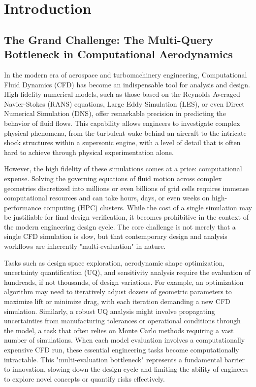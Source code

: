 \documentclass[dscexam, EN]{ufabcFHZh}
\begin{document}
\chapter{Introduction}

\section{The Grand Challenge: The Multi-Query Bottleneck in Computational Aerodynamics}

In the modern era of aerospace and turbomachinery engineering, Computational Fluid Dynamics (CFD) has become an indispensable tool for analysis and design. High-fidelity numerical models, such as those based on the Reynolds-Averaged Navier-Stokes (RANS) equations, Large Eddy Simulation (LES), or even Direct Numerical Simulation (DNS), offer remarkable precision in predicting the behavior of fluid flows. This capability allows engineers to investigate complex physical phenomena, from the turbulent wake behind an aircraft to the intricate shock structures within a supersonic engine, with a level of detail that is often hard to achieve through physical experimentation alone.

However, the high fidelity of these simulations comes at a price: computational expense. Solving the governing equations of fluid motion across complex geometries discretized into millions or even billions of grid cells requires immense computational resources and can take hours, days, or even weeks on high-performance computing (HPC) clusters. While the cost of a single simulation may be justifiable for final design verification, it becomes prohibitive in the context of the modern engineering design cycle. The core challenge is not merely that a single CFD simulation is slow, but that contemporary design and analysis workflows are inherently "multi-evaluation" in nature.

Tasks such as design space exploration, aerodynamic shape optimization, uncertainty quantification (UQ), and sensitivity analysis require the evaluation of hundreads, if not thousands, of design variations. For example, an optimization algorithm may need to iteratively adjust dozens of geometric parameters to maximize lift or minimize drag, with each iteration demanding a new CFD simulation. Similarly, a robust UQ analysis might involve propagating uncertainties from manufacturing tolerances or operational conditions through the model, a task that often relies on Monte Carlo methods requiring a vast number of simulations. When each model evaluation involves a computationally expensive CFD run, these essential engineering tasks become computationally intractable. This "multi-evaluation bottleneck" represents a fundamental barrier to innovation, slowing down the design cycle and limiting the ability of engineers to explore novel concepts or quantify risks effectively.
\end{document}
